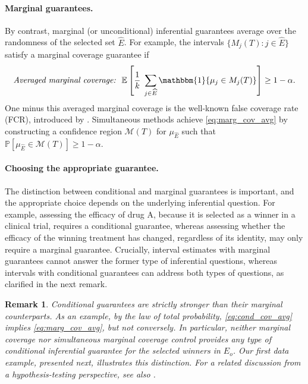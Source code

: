 \documentclass[12pt]{article}
\newtheorem{remark}{Remark}
\begin{document}
\paragraph{Marginal guarantees.} 
By contrast, marginal (or unconditional) inferential guarantees average over the randomness of the selected set $\widehat{E}$. 
For example, the intervals $\{M_{j}(T): j\in \widehat{E}\}$ satisfy a marginal coverage guarantee if
\begin{equation}
    \label{eq:marg_cov_avg}
 \text{\textit{Averaged marginal coverage:}} \ \ \mathbb{E}
\left[
\dfrac{1}{k}
\;\sum_{j\in\widehat E}
\mathbbm{1}\{\mu_j\in M_{j}(T)\}
\right] \geq 1-\alpha.
\end{equation}
One minus this averaged marginal coverage is the well-known false coverage rate (FCR), introduced by \cite{benjamini2005false}. 
Simultaneous methods achieve \eqref{eq:marg_cov_avg} by constructing a confidence
region $\mathcal M(T)$ for $\mu_{\widehat E}$ such that
$\mathbb P[\mu_{\widehat E}\in\mathcal M(T)]\geq 1-\alpha$.

\paragraph{Choosing the appropriate guarantee.} 
The distinction between conditional and marginal guarantees is important, and the appropriate choice depends on the underlying inferential question. 
For example, assessing the efficacy of drug A, because it is selected as a winner in a clinical trial, requires a conditional guarantee, whereas assessing whether the efficacy of the winning treatment has changed, regardless of its identity, may only require a marginal guarantee.
Crucially, interval estimates with marginal guarantees cannot answer the former type of inferential questions, whereas intervals with conditional guarantees can address both types of questions, as clarified in the next remark.

\begin{remark}
Conditional guarantees are strictly stronger than their marginal counterparts. As an example, by the law of total probability, \eqref{eq:cond_cov_avg} implies \eqref{eq:marg_cov_avg}, but not conversely. 
In particular, neither marginal coverage nor simultaneous marginal coverage control provides any type of conditional inferential guarantee for the selected winners in $E_o$.
Our first data example, presented next, illustrates this distinction.
For a related discussion from a hypothesis-testing perspective, see also \cite{neufeld2026inference}.
\label{rem:distinction}
\end{remark}
\end{document}
